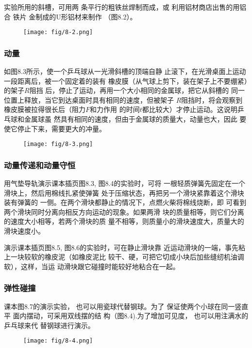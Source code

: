 实验所用的斜槽，可用两
条平行的粗铁丝焊制而成，或
利用铝材商店出售的用铝合
铁片
金制成的U形铝材来制作
（图8.2）。
\begin{figure}[htp]
    \centering
    \texttt{[image: fig/8-2.png]}
    \caption{}
\end{figure}

\subsubsection{动量}
如图8.3所示，使一个乒乓球从一光滑斜槽的顶端自静
止滚下，在光滑桌面上运动一段距离后，被一个固定着的装有
橡皮膜（从气球上剪下，装在架子上不要绷紧）的架子$R$阻挡
后，停止了运动，再用一个大小相同的金属球，把它从斜槽的
同一位置上释放，当它到达桌面时具有相同的速度，但被架子
$R$阻挡时，将会观察到橡皮膜被拉得很长后（阻力$F$和力作用
的时间$t$都比较大）才停止运动。这说明乒乓球和金属球虽
然具有相同的速度，但由于金属球的质量大，动量也大，因此
要使它停止下来，需要更大的冲量。
\begin{figure}[htp]
    \centering
    \texttt{[image: fig/8-3.png]}
    \caption{}
\end{figure}


\subsubsection{动量传递和动量守恒}
用气垫导轨演示课本插页图8.3, 图8.4的实验时，可将
一根轻质弹簧先固定在一个滑块上，然后用棉线扎紧使弹簧
处于压缩状态，再把另一个滑块紧靠着这个滑块装有弹簧的
一侧。在两个滑块都静止的情况下，点燃火柴将棉线烧断，即
可看到两个滑块同时分离向相反方向运动的现象。如果两滑
块的质量相等，则它们分离的速度大小相等，若两个滑块的质
量不相等，则质量小的滑块速度大，质量大的滑块速度小。

演示课本插页图8.5, 图8.6的实验时，可在静止滑块靠
近运动滑块的一端，事先粘上一块较软的橡皮泥（如橡皮泥比
较干、硬，可把它切成小块后加些缝纫机油调软），这样，当运
动滑块跟它碰撞时能较好地粘合在一起。

\subsubsection{弹性碰撞}
课本图8.7的演示实验，
也可以用瓷球代替钢球。为了
保证使两个小球在同一竖直平
面内摆动，可采用双线摆的结
构（图8.4).为了增加可见度，
也可以用注满水的乒乓球来代
替钢球进行演示。
\begin{figure}[htp]
    \centering
    \texttt{[image: fig/8-4.png]}
    \caption{}
\end{figure}


